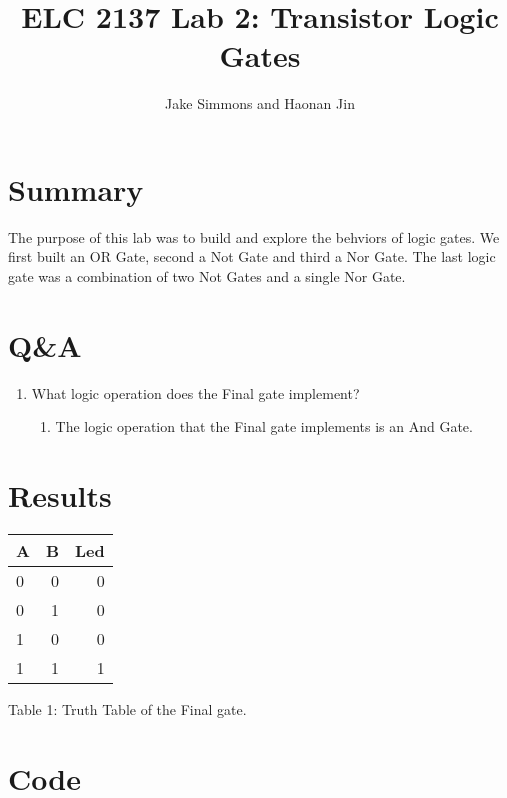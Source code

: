 \documentclass[11pt]{article}
\begin{document}
\title{ELC 2137 Lab 2: Transistor Logic Gates}
\author{Jake Simmons and Haonan Jin}
\maketitle

\section*{Summary}

The purpose of this lab was to build and explore the behviors of logic gates. We first built an OR Gate, second a Not Gate and third a Nor Gate. The last logic gate was a combination of two Not Gates and a single Nor Gate.    


\section*{Q\&A}

\begin{enumerate}
	\item What logic operation does the Final gate implement?
		\begin{enumerate}
			\item The logic operation that the Final gate implements is an And Gate.
		\end{enumerate}
\end{enumerate}



\section*{Results}

\begin{center}
	\begin{tabular}{l|r|r}
	 A & B & Led \\
	\midrule
	0 & 0 & 0  \\
	0 & 1 & 0 \\
	1 & 0 & 0  \\
	1 & 1 & 1  \\
	\bottomrule
	

	\end{tabular}\medskip
		\begin{center}
				\caption{Table 1: Truth Table of the Final gate. }
		\end{center}
\end{center}


\section*{Code}
\end{document}
